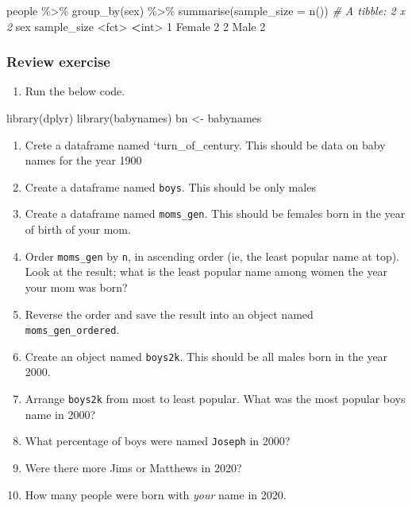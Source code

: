 \documentclass[
]{book}
\newenvironment{Shaded}{\begin{snugshade}}{\end{snugshade}}
\newcommand{\AttributeTok}[1]{\textcolor[rgb]{0.77,0.63,0.00}{#1}}
\newcommand{\CommentTok}[1]{\textcolor[rgb]{0.56,0.35,0.01}{\textit{#1}}}
\newcommand{\DecValTok}[1]{\textcolor[rgb]{0.00,0.00,0.81}{#1}}
\newcommand{\ErrorTok}[1]{\textcolor[rgb]{0.64,0.00,0.00}{\textbf{#1}}}
\newcommand{\FunctionTok}[1]{\textcolor[rgb]{0.00,0.00,0.00}{#1}}
\newcommand{\NormalTok}[1]{#1}
\newcommand{\OtherTok}[1]{\textcolor[rgb]{0.56,0.35,0.01}{#1}}
\newcommand{\SpecialCharTok}[1]{\textcolor[rgb]{0.00,0.00,0.00}{#1}}
\providecommand{\tightlist}{%
  \setlength{\itemsep}{0pt}\setlength{\parskip}{0pt}}
\begin{document}
\begin{Shaded}
\begin{Highlighting}[]
\NormalTok{people }\SpecialCharTok{\%\textgreater{}\%}
  \FunctionTok{group\_by}\NormalTok{(sex) }\SpecialCharTok{\%\textgreater{}\%}
  \FunctionTok{summarise}\NormalTok{(}\AttributeTok{sample\_size =} \FunctionTok{n}\NormalTok{())}
\CommentTok{\# A tibble: 2 x 2}
\NormalTok{  sex    sample\_size}
  \SpecialCharTok{\textless{}}\NormalTok{fct}\SpecialCharTok{\textgreater{}}        \ErrorTok{\textless{}}\NormalTok{int}\SpecialCharTok{\textgreater{}}
\DecValTok{1}\NormalTok{ Female           }\DecValTok{2}
\DecValTok{2}\NormalTok{ Male             }\DecValTok{2}
\end{Highlighting}
\end{Shaded}

\hypertarget{review-exercise-1}{%
\subsubsection*{Review exercise}\label{review-exercise-1}}

\begin{enumerate}
\def\labelenumi{\arabic{enumi}.}
\tightlist
\item
  Run the below code.
\end{enumerate}

\begin{Shaded}
\begin{Highlighting}[]
\FunctionTok{library}\NormalTok{(dplyr)}
\FunctionTok{library}\NormalTok{(babynames)}
\NormalTok{bn }\OtherTok{\textless{}{-}}\NormalTok{ babynames}
\end{Highlighting}
\end{Shaded}

\begin{enumerate}
\def\labelenumi{\arabic{enumi}.}
\setcounter{enumi}{1}
\item
  Crete a dataframe named `turn\_of\_century. This should be data on baby names for the year 1900
\item
  Create a dataframe named \texttt{boys}. This should be only males
\item
  Create a dataframe named \texttt{moms\_gen}. This should be females born in the year of birth of your mom.
\item
  Order \texttt{moms\_gen} by \texttt{n}, in ascending order (ie, the least popular name at top). Look at the result; what is the least popular name among women the year your mom was born?
\item
  Reverse the order and save the result into an object named \texttt{moms\_gen\_ordered}.
\item
  Create an object named \texttt{boys2k}. This should be all males born in the year 2000.
\item
  Arrange \texttt{boys2k} from most to least popular. What was the most popular boys name in 2000?
\item
  What percentage of boys were named \texttt{Joseph} in 2000?
\item
  Were there more Jims or Matthews in 2020?
\item
  How many people were born with \emph{your} name in 2020.
\end{enumerate}
\end{document}
